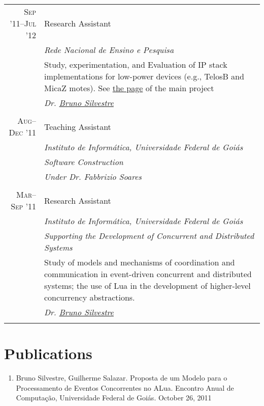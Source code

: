 \documentclass[a4paper,10pt]{article}
\begin{document}
\begin{tabular}{r|p{11cm}}
  \textsc{Sep '11--Jul '12}
  & Research Assistant \\
  &\emph{Rede Nacional de Ensino e Pesquisa}\\
  &\footnotesize{Study, experimentation, and Evaluation of IP stack implementations 
  for low-power devices (e.g., TelosB and MicaZ motes). See 
            \href{http://www.nr2.ufpr.br/cia2/}{the page} of the main project}\\
  &\emph{Dr. \href{http://inf.ufg.br/~brunoos/}{Bruno Silvestre}}
  \\\multicolumn{2}{c}{} \\

  \textsc{Aug--Dec '11}
  & Teaching Assistant \\
  &\emph{Instituto de Informática, Universidade Federal de Goiás}\\
  &\emph{\footnotesize{Software Construction}} \\
  &\emph{Under Dr. Fabbrizio Soares}
  \\\multicolumn{2}{c}{} \\

  \textsc{Mar--Sep '11}
  & Research Assistant \\
  &\emph{Instituto de Informática, Universidade Federal de Goiás}\\
  &\emph{Supporting the Development of Concurrent and Distributed Systems}\\
  &\indent \footnotesize{Study of models and mechanisms of coordination and 
        communication in event-driven concurrent and distributed systems; the 
        use of Lua in the development of higher-level concurrency abstractions.}\\
  &\emph{Dr. \href{http://inf.ufg.br/~brunoos/}{Bruno Silvestre}}
  \\\multicolumn{2}{c}{} \\

\end{tabular}

\section{Publications}
\begin{enumerate}
  \renewcommand{\labelenumi}{[\arabic{enumi}] }
  \item Bruno Silvestre, Guilherme Salazar. Proposta de um Modelo para o
        Processamento de Eventos Concorrentes no ALua. Encontro Anual de
        Computação, Universidade Federal de Goiás. October 26, 2011 \\
\end{enumerate}
\end{document}
